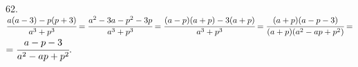 62. $\cfrac{a(a-3)-p(p+3)}{a^3+p^3}=\cfrac{a^2-3a-p^2-3p}{a^3+p^3}=\cfrac{(a-p)(a+p)-3(a+p)}{a^3+p^3}=\cfrac{(a+p)(a-p-3)}{(a+p)(a^2-ap+p^2)}=$\\$
=\cfrac{a-p-3}{a^2-ap+p^2}.$\\
